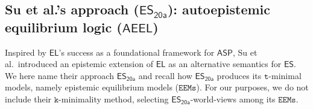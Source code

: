 \documentclass[submission,copyright,creativecommons]{eptcs}
\newcommand{\logic}[1]  { \ensuremath{\mathsf{#1}} }
\newcommand{\ASP}  { \logic{ASP} }
\newcommand{\EL}  { \logic{EL} }
\newcommand{\ES}  { \logic{ES} }
\newcommand{\AEEL}  { \logic{AEEL} }
\newcommand{\ESyirmia}  { \logic{ES_{\scriptscriptstyle{20a}} } }
\newcommand{\EEMs}  { \texttt{EEMs} }
\begin{document}
\subsection{Su et al.'s approach 
{\normalfont (\texorpdfstring{$\ESyirmia$}{ESyirmia}):} 
autoepistemic equilibrium logic \normalfont (\texorpdfstring{$\AEEL$}{AEEL})}
\label{subsec:EEL.FHS}
Inspired by $\EL$'s success as a foundational framework for $\ASP$, 
Su et al.\ introduced \cite{SuThesis15,Suijcai15,SuAI20} 
an epistemic extension of $\EL$ as an alternative semantics for $\ES$. 
We here name their approach $\ESyirmia$ and recall
how $\ESyirmia$ produces its $\texttt{t}$-minimal models, 
namely epistemic equilibrium models ($\EEMs$). 
For our purposes, we do not include their $\texttt{k}$-minimality method, 
selecting $\ESyirmia$-world-views among its $\EEMs$. 

\end{document}
